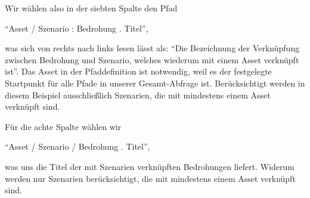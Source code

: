 \documentclass[a4paper,10pt]{book}
\begin{document}
Wir wählen also in der siebten Spalte den Pfad

``Asset / Szenario : Bedrohung . Titel'',

was sich von rechts nach links lesen lässt als: ``Die Bezeichnung der
Verknüpfung zwischen Bedrohung und Szenario, welches wiederum mit einem Asset
verknüpft ist''. Das Asset in der Pfaddefinition ist notwendig, weil es der
festgelegte Startpunkt für alle Pfade in unserer Gesamt-Abfrage ist.
Berücksichtigt werden in diesem Beispiel ausschließlich Szenarien, die mit
mindestens einem Asset verknüpft sind.

Für die achte Spalte wählen wir

``Asset / Szenario / Bedrohung . Titel'',

was uns die Titel der mit Szenarien verknüpften Bedrohungen liefert. Widerum
werden nur Szenarien berücksichtigt, die mit mindestens einem Asset verknüpft
sind.
\end{document}
